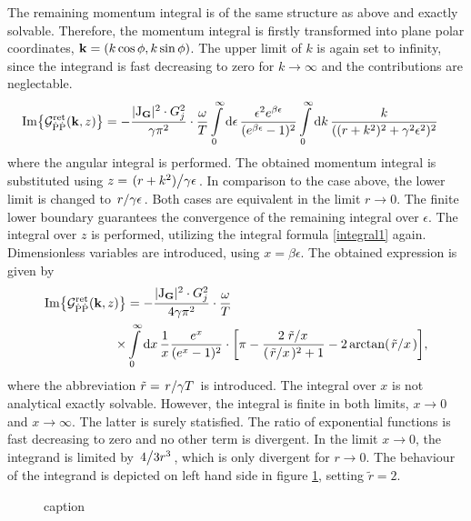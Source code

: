 The remaining momentum integral is of the same structure as above and exactly solvable.
Therefore, the momentum integral is firstly transformed into plane polar coordinates, $\vb{k} = (k\cos\phi, k\sin\phi)$.
The upper limit of $k$ is again set to infinity, since the integrand is fast decreasing to zero for $k \to \infty$ and the contributions are neglectable.
%
\begin{align}
	\Im{\mathcal{G}_{\dot{\mathrm{P}}\dot{\mathrm{P}}}^{\mathrm{ret}}(\vb{k}, z)} &= 
		-\frac{\vert \mathrm{J}_{\vb{G}} \vert^{2} \cdot G_{j}^{2}}{\gamma \pi^{2}} \cdot 
		\frac{\omega}{T}
		\int\limits_{0}^{\infty} \dd{\epsilon}
		\frac{\epsilon^{2} e^{\beta \epsilon}}{(e^{\beta \epsilon} - 1)^{2}}
		\int\limits_{0}^{\infty} \dd{k}
		\frac{k}{((r + k^{2})^{2} + \gamma^{2} \epsilon^{2})^{2}}
	\label{eq:starting expression}
\end{align}
%
where the angular integral is performed.
The obtained momentum integral is substituted using $z = \flatfrac{(r + k^{2})}{\gamma\epsilon}$.
In comparison to the case above, the lower limit is changed to $\flatfrac{r}{\gamma \epsilon}$.
Both cases are equivalent in the limit $r \to 0$.
The finite lower boundary guarantees the convergence of the remaining integral over $\epsilon$.
The integral over $z$ is performed, utilizing the integral formula \eqref{integral1} again.
Dimensionless variables are introduced, using $x = \beta \epsilon$.
The obtained expression is given by
%
\begin{align}
	\Im{\mathcal{G}_{\dot{\mt{P}}\dot{\mt{P}}}^{\mt{ret}}(\vb{k}, z)} &= 
		-\frac{\vert \mt{J}_{\vb{G}} \vert^{2} \cdot G_{j}^{2}}{4 \gamma \pi^{2}} \cdot 
		\frac{\omega}{T}
		\notag \\
		\times &\int\limits_{0}^{\infty} \dd{x}
		\frac{1}{x} \frac{e^{x}}{(e^{x} - 1)^{2}} \cdot
		\bigg[\pi - \frac{2 \flatfrac{\tilde{r}}{x}}{(\flatfrac{\tilde{r}}{x})^2 + 1} - 2 \arctan(\flatfrac{\tilde{r}}{x})\bigg],
\end{align}
%
where the abbreviation $\tilde{r} = \flatfrac{r}{\gamma T}$ is introduced.
The integral over $x$ is not analytical exactly solvable.
However, the integral is finite in both limits, $x \to 0$ and $x \to \infty$.
The latter is surely statisfied.
The ratio of exponential functions is fast decreasing to zero and no other term is divergent.
In the limit $x \to 0$, the integrand is limited by $\flatfrac{4}{3r^{3}}$, which is only divergent for $r \to 0$.
The behaviour of the integrand is depicted on left hand side in figure \ref{fig:behaviour integrand}, setting $\tilde{r} = 2$.
%
\begin{figure}[t]
	\centering
	\caption{caption}
	\label{fig:behaviour integrand}
\end{figure}
